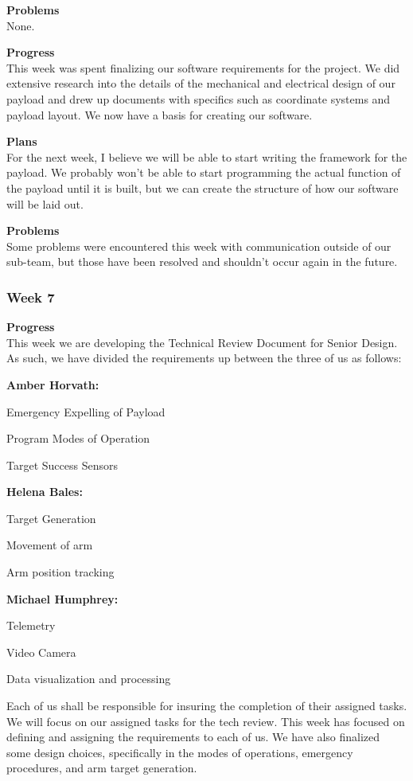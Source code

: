\textbf{Problems} \\
None.

\textbf{Progress} \\
This week was spent finalizing our software requirements for the project. We did extensive research into the details of the mechanical and electrical design of our \gls{payload} and drew up documents with specifics such as coordinate systems and \gls{payload} layout. We now have a basis for creating our software.

\textbf{Plans} \\
For the next week, I believe we will be able to start writing the framework for the \gls{payload}. We probably won't be able to start programming the actual function of the \gls{payload} until it is built, but we can create the structure of how our software will be laid out.

\textbf{Problems} \\
Some problems were encountered this week with communication outside of our sub-team, but those have been resolved and shouldn't occur again in the future.

\subsubsection{Week 7}
\textbf{Progress} \\
This week we are developing the Technical Review Document for Senior Design. As such, we have divided the requirements up between the three of us as follows:

\textbf{Amber Horvath:}

    Emergency Expelling of Payload

    Program Modes of Operation

    Target Success Sensors

\textbf{Helena Bales:}

    Target Generation

    Movement of arm

    Arm position tracking

\textbf{Michael Humphrey:}

    Telemetry

    Video Camera

    Data visualization and processing

Each of us shall be responsible for insuring the completion of their assigned tasks. We will focus on our assigned tasks for the tech review. This week has focused on defining and assigning the requirements to each of us. We have also finalized some design choices, specifically in the modes of operations, emergency procedures, and arm target generation.

